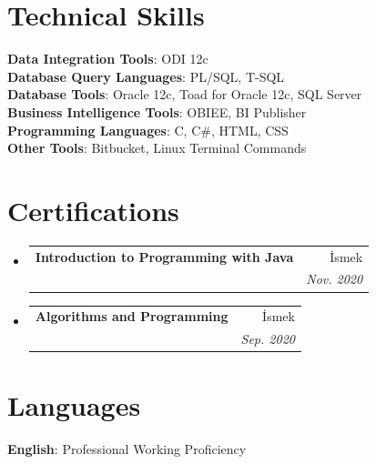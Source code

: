 \documentclass[letterpaper,11pt]{article}
\makeatletter
\newcommand{\resumeSubheading}[4]{
  \vspace{-2pt}\item
    \begin{tabular*}{0.97\textwidth}[t]{l@{\extracolsep{\fill}}r}
      \textbf{#1} & #2 \\
      \textit{\small#3} & \textit{\small #4} \\
    \end{tabular*}\vspace{-7pt}
}
\newcommand{\resumeSubHeadingListStart}{\begin{itemize}[leftmargin=0.15in, label={}]}
\newcommand{\resumeSubHeadingListEnd}{\end{itemize}}
\makeatother
\begin{document}
%
\section{Technical Skills}
 \begin{itemize}[leftmargin=0.15in, label={}]
    \small{\item{
     \textbf{Data Integration Tools}{: ODI 12c} \\
     \textbf{Database Query Languages}{: PL/SQL, T-SQL}\\
     \textbf{Database Tools}{: Oracle 12c, Toad for Oracle 12c, SQL Server} \\
     \textbf{Business Intelligence Tools}{: OBIEE, BI Publisher}\\
     \textbf{Programming Languages}{: C, C\#, HTML, CSS}\\
     \textbf{Other Tools}{: Bitbucket, Linux Terminal Commands}
    }}
 \end{itemize}

\section{Certifications}
  \resumeSubHeadingListStart
    \resumeSubheading
      {Introduction to Programming with Java}{İsmek}
      {}{Nov. 2020}
    \resumeSubheading
      {Algorithms and Programming}{İsmek}
      {}{Sep. 2020}
  \resumeSubHeadingListEnd

\section{Languages}
 \begin{itemize}[leftmargin=0.15in, label={}]
    \small{\item{
     \textbf{English}{: Professional Working Proficiency}
    }}
 \end{itemize}


\end{document}
